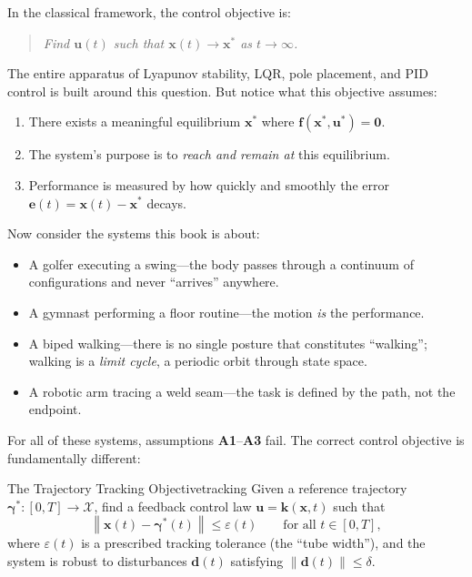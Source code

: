 \documentclass[12pt, openany]{book}
\theoremstyle{plain}
\newcommand{\state}{\bm{x}}
\newcommand{\control}{\bm{u}}
\newcommand{\traj}{\bm{\gamma}}
\newcommand{\statespace}{\mathcal{X}}
\newcommand{\norm}[1]{\left\lVert #1 \right\rVert}
\begin{document}
In the classical framework, the control objective is:
\begin{quote}
  \emph{Find $\control(t)$ such that $\state(t) \to \state^*$ as $t \to \infty$.}
\end{quote}
The entire apparatus of Lyapunov stability, LQR, pole placement, and PID control
is built around this question. But notice what this objective assumes:

\begin{enumerate}[leftmargin=2cm, label=\textbf{A\arabic*.}]
  \item There exists a meaningful equilibrium $\state^*$ where $\bm{f}(\state^*, \control^*) = \bm{0}$.
  \item The system's purpose is to \emph{reach and remain at} this equilibrium.
  \item Performance is measured by how quickly and smoothly the error
        $\bm{e}(t) = \state(t) - \state^*$ decays.
\end{enumerate}

Now consider the systems this book is about:

\begin{itemize}[leftmargin=1.5cm]
  \item A golfer executing a swing---the body passes through a continuum of
        configurations and never ``arrives'' anywhere.
  \item A gymnast performing a floor routine---the motion \emph{is} the performance.
  \item A biped walking---there is no single posture that constitutes ``walking'';
        walking is a \emph{limit cycle}, a periodic orbit through state space.
  \item A robotic arm tracing a weld seam---the task is defined by the path, not the endpoint.
\end{itemize}

For all of these systems, assumptions \textbf{A1}--\textbf{A3} fail. The correct
control objective is fundamentally different:

\begin{principle}{The Trajectory Tracking Objective}{tracking}
  Given a reference trajectory $\traj^*: [0, T] \to \statespace$, find a feedback
  control law $\control = \bm{k}(\state, t)$ such that
  \begin{equation}\label{eq:tracking_obj}
    \norm{\state(t) - \traj^*(t)} \leq \varepsilon(t)
    \qquad \text{for all } t \in [0, T],
  \end{equation}
  where $\varepsilon(t)$ is a prescribed tracking tolerance (the ``tube width''),
  and the system is robust to disturbances $\bm{d}(t)$ satisfying
  $\norm{\bm{d}(t)} \leq \delta$.
\end{principle}
\end{document}
